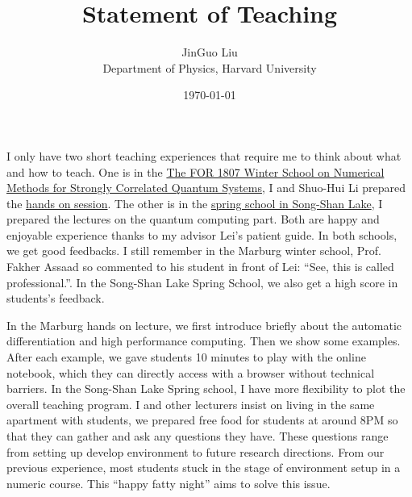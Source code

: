 \documentclass[a4paper]{article}
\title{Statement of Teaching}
\author{JinGuo Liu\\ Department of Physics, Harvard University}
\date{\today}
\newcommand{\<}{\langle}
\renewcommand{\>}{\rangle}
\begin{document}
\fontsize{10}{13}
\selectfont
\maketitle

I only have two short teaching experiences that require me to think about what and how to teach.
One is in the \href{https://for1807.physik.uni-wuerzburg.de/2017/07/11/winter-school-2018/}{The FOR 1807 Winter School on Numerical Methods for Strongly Correlated Quantum Systems}, I and Shuo-Hui Li prepared the \href{https://for1807.physik.uni-wuerzburg.de/2017/07/11/winter-school-2018/}{hands on session}.
The other is in the \href{https://github.com/QuantumBFS/SSSS}{spring school in Song-Shan Lake}, I prepared the lectures on the quantum computing part.
Both are happy and enjoyable experience thanks to my advisor Lei's patient guide.
In both schools, we get good feedbacks. I still remember in the Marburg winter school, Prof. Fakher Assaad so commented to his student in front of Lei: ``See, this is called professional.''.
In the Song-Shan Lake Spring School, we also get a high score in students's feedback.

In the Marburg hands on lecture, we first introduce briefly about the automatic differentiation and high performance computing.
Then we show some examples. After each example, we gave students 10 minutes to play with the online notebook, which they can directly access with a browser without technical barriers.
In the Song-Shan Lake Spring school, I have more flexibility to plot the overall teaching program.
I and other lecturers insist on living in the same apartment with students,
we prepared free food for students at around 8PM so that they can gather and ask any questions they have.
These questions range from setting up develop environment to future research directions.
From our previous experience, most students stuck in the stage of environment setup in a numeric course.
This ``happy fatty night'' aims to solve this issue.
\end{document}
